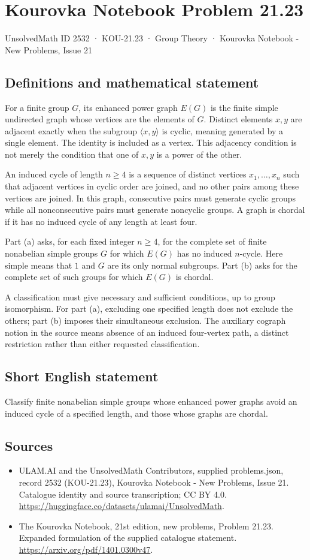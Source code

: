 \documentclass[11pt,a4paper]{article}
\begin{document}
\section*{Kourovka Notebook Problem 21.23}\label{2532}
{\small UnsolvedMath ID 2532 · KOU-21.23 · Group Theory · Kourovka Notebook - New Problems, Issue 21}
\subsection{Definitions and mathematical statement}
For a finite group $G$, its enhanced power graph $E(G)$ is the finite
simple undirected graph whose vertices are the elements of $G$.
Distinct elements $x,y$ are adjacent exactly when the subgroup
$\langle x,y\rangle$ is cyclic, meaning generated by a single element.
The identity is included as a vertex. This adjacency condition is not
merely the condition that one of $x,y$ is a power of the other.

An induced cycle of length $n\ge4$ is a sequence of distinct vertices
$x_1,\ldots,x_n$ such that adjacent vertices in cyclic order are joined,
and no other pairs among these vertices are joined. In this graph,
consecutive pairs must generate cyclic groups while all nonconsecutive
pairs must generate noncyclic groups. A graph is chordal if it has no
induced cycle of any length at least four.

Part (a) asks, for each fixed integer $n\ge4$, for the complete set of
finite nonabelian simple groups $G$ for which $E(G)$ has no induced
$n$-cycle. Here simple means that $1$ and $G$ are its only normal
subgroups. Part (b) asks for the complete set of such groups for which
$E(G)$ is chordal.

A classification must give necessary and sufficient conditions, up to
group isomorphism. For part (a), excluding one specified length does
not exclude the others; part (b) imposes their simultaneous exclusion.
The auxiliary cograph notion in the source means absence of an induced
four-vertex path, a distinct restriction rather than either requested
classification.
\subsection{Short English statement}
Classify finite nonabelian simple groups whose enhanced power graphs avoid an induced cycle of a specified length, and those whose graphs are chordal.
\subsection{Sources}
\begin{itemize}
\item[S1] ULAM.AI and the UnsolvedMath Contributors, supplied problems.json, record 2532 (KOU-21.23), Kourovka Notebook - New Problems, Issue 21. Catalogue identity and source transcription; CC BY 4.0.
\url{https://huggingface.co/datasets/ulamai/UnsolvedMath}.
\item[S2] The Kourovka Notebook, 21st edition, new problems, Problem 21.23. Expanded formulation of the supplied catalogue statement.
\url{https://arxiv.org/pdf/1401.0300v47}.
\end{itemize}
\end{document}

